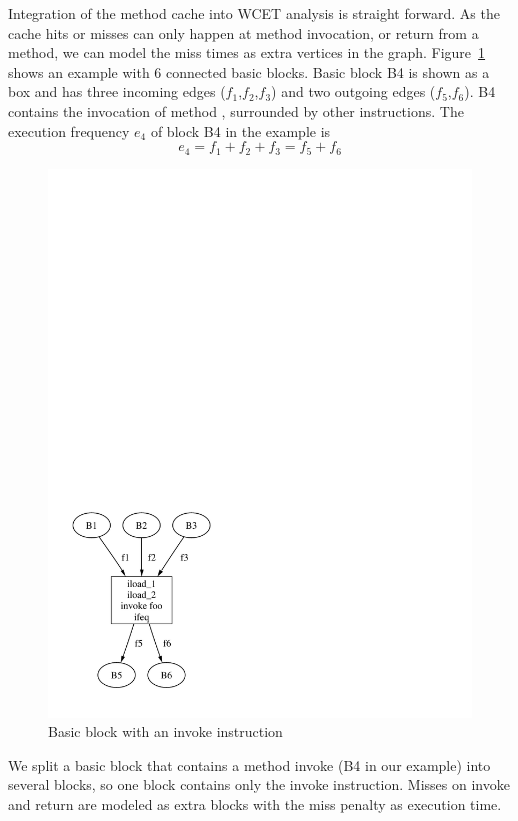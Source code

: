Integration of the method cache into WCET analysis is straight
forward. As the cache hits or misses can only happen at method
invocation, or return from a method, we can model the miss times as
extra vertices in the graph. Figure~\ref{fig:cache:bb} shows an
example with 6 connected basic blocks. Basic block B4 is shown as a
box and has three incoming edges ($f_1$,$f_2$,$f_3$) and two outgoing
edges ($f_5$,$f_6$). B4 contains the invocation of method
, surrounded by other instructions. The execution
frequency $e_4$ of block B4 in the example is
\begin{equation*}
    e_4 = f_1+f_2+f_3 = f_5+f_6
\end{equation*}

\begin{figure}
    \centering
    \includegraphics[scale=0.5]{wcet/cache_bb}
    \caption{Basic block with an invoke instruction}
    \label{fig:cache:bb}
\end{figure}

We split a basic block that contains a method invoke (B4 in our
example) into several blocks, so one block contains only the invoke
instruction. Misses on invoke and return are modeled as extra blocks
with the miss penalty as execution time.

